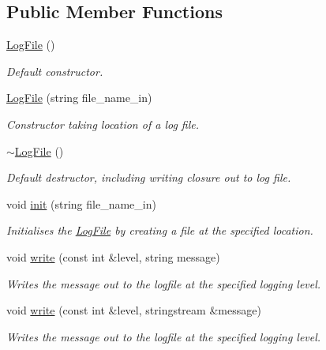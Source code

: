 \subsection*{Public Member Functions}
\begin{DoxyCompactItemize}
\item 
\hyperlink{class_log_file_ad11b3baf5602575c1396f726d3598188}{Log\+File} ()\hypertarget{class_log_file_ad11b3baf5602575c1396f726d3598188}{}\label{class_log_file_ad11b3baf5602575c1396f726d3598188}

\begin{DoxyCompactList}\small\item\em Default constructor. \end{DoxyCompactList}\item 
\hyperlink{class_log_file_a2658bd3713a4b4300dfb337905c2b5a0}{Log\+File} (string file\+\_\+name\+\_\+in)
\begin{DoxyCompactList}\small\item\em Constructor taking location of a log file. \end{DoxyCompactList}\item 
\hyperlink{class_log_file_a440a7de2dcbb9facb68e56dc47cb9dea}{$\sim$\+Log\+File} ()\hypertarget{class_log_file_a440a7de2dcbb9facb68e56dc47cb9dea}{}\label{class_log_file_a440a7de2dcbb9facb68e56dc47cb9dea}

\begin{DoxyCompactList}\small\item\em Default destructor, including writing closure out to log file. \end{DoxyCompactList}\item 
void \hyperlink{class_log_file_a985fac079d3d70822468aa3df85694ec}{init} (string file\+\_\+name\+\_\+in)
\begin{DoxyCompactList}\small\item\em Initialises the \hyperlink{class_log_file}{Log\+File} by creating a file at the specified location. \end{DoxyCompactList}\item 
void \hyperlink{class_log_file_ad8acf8bc3a616ad47f43307781ea3c63}{write} (const int \&level, string message)
\begin{DoxyCompactList}\small\item\em Writes the message out to the logfile at the specified logging level. \end{DoxyCompactList}\item 
void \hyperlink{class_log_file_a08c10809b0095438671be7603e1a53ae}{write} (const int \&level, stringstream \&message)
\begin{DoxyCompactList}\small\item\em Writes the message out to the logfile at the specified logging level. \end{DoxyCompactList}\end{DoxyCompactItemize}
